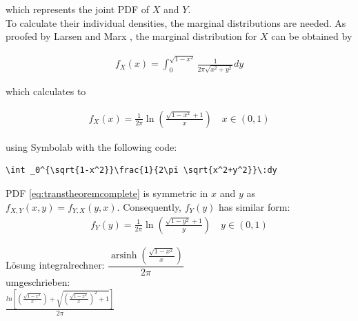 which represents the joint PDF of $X$ and $Y$.\\
To calculate their individual densities, the marginal distributions are needed. As proofed by Larsen and Marx \cite[Theorem~3.7.2]{larsen2005introduction}, the marginal distribution for $X$ can be obtained by 

\begin{equation}
\begin{split}
f_{X}(x) = \int_{0}^{\sqrt{1-x^2}}\frac{1}{2\pi\sqrt{x^2+y^2}} dy
\end{split}
\label{eq:marginalX}
\end{equation}

which calculates to 

\begin{equation}
\begin{split}
f_{X}(x) = \frac{1}{2\pi }\ln \left(\frac{\sqrt{1-x^2}+1}{x}\right) \quad x \in (0,1)
\end{split}
\label{eq:marginalXcalculated}
\end{equation}

using Symbolab \cite{symbolab} with the following code:
\begin{lstlisting}
\int _0^{\sqrt{1-x^2}}\frac{1}{2\pi \sqrt{x^2+y^2}}\:dy
\end{lstlisting}

PDF \ref{eq:transtheoremcomplete} is symmetric in $x$ and $y$ as $f_{X,Y}(x,y) = f_{Y,X}(y,x)$. Consequently, $f_Y(y)$ has similar form:
\begin{equation}
\begin{split}
f_{Y}(y) = \frac{1}{2\pi }\ln\left(\frac{\sqrt{1-y^2}+1}{y}\right) \quad y \in (0,1)
\end{split}
\label{eq:marginalYcalculated}
\end{equation}

Lösung integralrechner:
$\dfrac{\operatorname{arsinh}\left(\frac{\sqrt{1-x^2}}{x}\right)}{2{\pi}}$\\
umgeschrieben:\\
$\frac{ln\left[\left(\frac{\sqrt{1-x^2}}{x}\right)+\sqrt{\left(\frac{\sqrt{1-x^2}}{x}\right)^2+1}\right]}{2\pi}$

